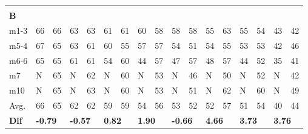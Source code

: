 \begin{table}[H]
\begin{tabular}{l|l|l|l|l|l|l|l|l|l|l|l|l|l|l|l|l}
\multicolumn{17}{l}{ } \\   
\textbf{B} & \multicolumn{2}{l|}{} & \multicolumn{2}{l|}{} & \multicolumn{2}{l|}{} & \multicolumn{2}{l|}{} & \multicolumn{2}{l|}{} & \multicolumn{2}{l|}{}& \multicolumn{2}{l|}{}& \multicolumn{2}{l}{}     \\ \hline
m1-3   &    66    &    66    &   63    &   63       &    61   &   61    &   60     &   58     &    58   &    58     &    55   &     63     &      55   &    54    &  43 &  42  \\
m5-4   &    67    &    65    &   63    &  61        &    60   &  55     &   57     &    57    &  54     &     51    &   54    &     55     &     53    &    53    &  42 &  46  \\
m6-6   &   65     &   65     &   61    &  61        &   54    &   60    &    44    &    57    &   47    &     57    &     48  &    57      &     44    &   52     &  35 &  41  \\
m7      &   N       &      65  &    N    &     62     &    N     &   60    &   N      &    53    &   N     &      46   &   N      &      50    &     N     &     52   &   N  &   42 \\
m10    &   N       &    65    &    N    &     63     &    N     &   60    &   N      &    53    &   N     &     51    &     N    &     62     &     N     &     60   &    N  &  49  \\ \hline
Avg.     &     66    &     65   &    62   &     62     &     59  &   59    &   54     &   56     &     53  &  52       &     52   &    57     &       51  &   54     & 40   & 44\\ \hline
\textbf{Dif}& \multicolumn{2}{l|}{\textbf{-0.79}} & \multicolumn{2}{l|}{\textbf{-0.57}} & \multicolumn{2}{l|}{\textbf{0.82}} & \multicolumn{2}{l|}{\textbf{1.90}} & \multicolumn{2}{l|}{\textbf{-0.66}} & \multicolumn{2}{l|}{\textbf{4.66}}& \multicolumn{2}{l|}{\textbf{3.73}}& \multicolumn{2}{l}{\textbf{3.76}}       
\end{tabular}
\label{ta:meas:approved_data_par}
\end{table}



